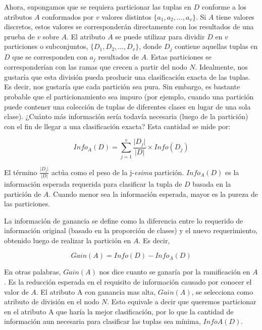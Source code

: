 Ahora, supongamos que se requiera particionar las tuplas en $D$ conforme a los atributos $A$ conformados por $v$ valores distintos $ \{ a_{1},a_{2},...,a_{v} \}$. Si $A$ tiene valores discretos, estos valores se corresponderán directamente con los resultados de una prueba de $v$ sobre $A$. El atributo $A$ se puede utilizar para dividir $D$ en $v$ particiones o subconjuntos, $ \{ D_{1},D_{2},...,D_{v} \}$, donde $D_j$ contiene aquellas tuplas en $D$ que se corresponden con $a_j$ resultados de $A$. Estas particiones se corresponderían con las ramas que crecen a partir del nodo $N$. Idealmente, nos gustaría que esta división pueda producir una clasificación exacta de las tuplas. Es decir, nos gustaría que cada partición sea pura. Sin embargo, es bastante probable que el particionamiento sea impuro (por ejemplo, cuando una partición puede contener una colección de tuplas de diferentes clases en lugar de una sola clase). ¿Cuánto más información sería todavía necesaria (luego de la partición) con el fin de llegar a una clasificación exacta? Esta cantidad se mide por:

\begin{equation}
Info_{A}(D) = \displaystyle\sum_{j=1}^{v} \displaystyle\frac{\lvert D_{j} \rvert}{\lvert D \rvert} \times Info(D_{j})\label{eq3:infoA}
\end{equation}

El término $\displaystyle\frac{\lvert D_{j} \rvert}{\lvert D \rvert}$ actúa como el peso de la j-\emph{esima} partición. $Info_{A}(D)$ es la información esperada requerida para clasificar la tupla de $D$ basada en la partición de $A$. Cuando menor sea la información esperada, mayor es la pureza de las particiones.

La información de ganancia se define como la diferencia entre lo requerido de información original (basado en la proporción de clases) y el nuevo requerimiento, obtenido luego de realizar la partición en $A$. Es decir,

\begin{equation}
Gain(A) = Info(D) - Info_{A}(D)\label{eq3:ganancia}
\end{equation}

En otras palabras, $Gain(A)$ nos dice cuanto se ganaría por la ramificación en $A$. Es la reducción esperada en el requisito de información causado por conocer el valor de $A$. El atributo A con ganancia mas alta, $Gain(A)$, se selecciona como atributo de división en el nodo $N$. Esto equivale a decir que queremos particionar en el atributo A que haría la mejor clasificación, por lo que la cantidad de información aun necesaria para clasificar las tuplas sea mínima, $InfoA(D)$.

